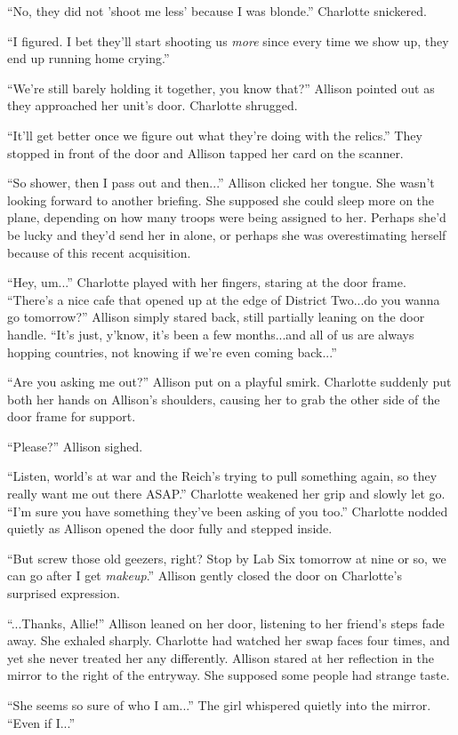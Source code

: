 \begin{Standard}
``No, they did not 'shoot me less' because I was blonde.'' Charlotte snickered.

``I figured. I bet they'll start shooting us \emph{more} since every time we show up,
they end up running home crying.''

``We're still barely holding it together, you know that?'' Allison pointed out as they
approached her unit's door. Charlotte shrugged.

``It'll get better once we figure out what they're doing with the relics.'' They stopped
in front of the door and Allison tapped her card on the scanner.

``So shower, then I pass out and then...'' Allison clicked her tongue. She wasn't
looking forward to another briefing. She supposed she could sleep more on the plane,
depending on how many troops were being assigned to her. Perhaps she'd be lucky
and they'd send her in alone, or perhaps she was overestimating herself because
of this recent acquisition.

``Hey, um...'' Charlotte played with her fingers, staring at the door frame.
``There's a nice cafe that opened up at the edge of District Two...do you wanna
go tomorrow?'' Allison simply stared back, still partially leaning on the door handle.
``It's just, y'know, it's been a few months...and all of us are always hopping
countries, not knowing if we're even coming back...''

``Are you asking me out?'' Allison put on a playful smirk. Charlotte suddenly put
both her hands on Allison's shoulders, causing her to grab the other side of the
door frame for support.

``Please?'' Allison sighed.

``Listen, world's at war and the Reich's trying to pull something again, so they
really want me out there ASAP.'' Charlotte weakened her grip and slowly let go.
``I'm sure you have something they've been asking of you too.'' Charlotte
nodded quietly as Allison opened the door fully and stepped inside.

``But screw those old geezers, right? Stop by Lab Six tomorrow at nine or so,
we can go after I get \emph{makeup}.'' Allison gently closed the door on
Charlotte's surprised expression.

``...Thanks, Allie!'' Allison leaned on her door, listening to her friend's steps
fade away. She exhaled sharply. Charlotte had watched her swap faces four times,
and yet she never treated her any differently. Allison stared at her reflection
in the mirror to the right of the entryway. She supposed some people had
strange taste.

``She seems so sure of who I am...'' The girl whispered quietly into the mirror.
``Even if I...''
\end{Standard}
